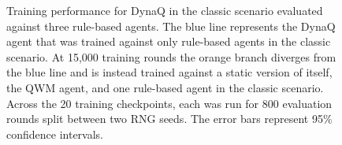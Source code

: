\documentclass[article, 10pt]{IEEEtran}
\begin{document}

\begin{figure}[!h]
    \centering
    \caption{Training performance for DynaQ in the classic scenario evaluated against three rule-based agents. The blue line represents the DynaQ agent that was trained against only rule-based agents in the classic scenario. At 15,000 training rounds the orange branch diverges from the blue line and is instead trained against a static version of itself, the QWM agent, and one rule-based agent in the classic scenario. Across the 20 training checkpoints, each was run for 800 evaluation rounds split between two RNG seeds. The error bars represent 95\% confidence intervals.}
    \label{DynaQ Classic Scenario Training Curves}
\end{figure}
\end{document}
